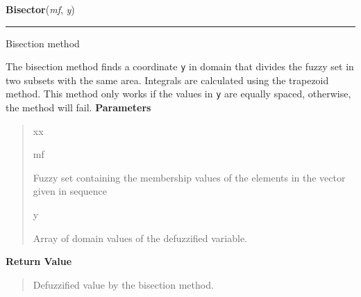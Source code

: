     \vspace{0.5ex}

\hspace{.8\funcindent}\begin{boxedminipage}{\funcwidth}

    \raggedright \textbf{Bisector}(\textit{mf}, \textit{y})

    \vspace{-1.5ex}

    \rule{\textwidth}{0.5\fboxrule}
\setlength{\parskip}{2ex}

Bisection method

The bisection method finds a coordinate \texttt{y} in domain that divides the
fuzzy set in two subsets with the same area. Integrals are calculated using
the trapezoid method. This method only works if the values in \texttt{y} are
equally spaced, otherwise, the method will fail.
\setlength{\parskip}{1ex}
      \textbf{Parameters}
      \vspace{-1ex}

      \begin{quote}
        \begin{Ventry}{xx}

          \item[mf]


Fuzzy set containing the membership values of the elements in the
vector given in sequence
          \item[y]


Array of domain values of the defuzzified variable.
        \end{Ventry}

      \end{quote}

      \textbf{Return Value}
    \vspace{-1ex}

      \begin{quote}

Defuzzified value by the bisection method.
      \end{quote}

    \end{boxedminipage}

    \label{peach:fuzzy:defuzzy:SmallestOfMaxima}

    \vspace{0.5ex}

